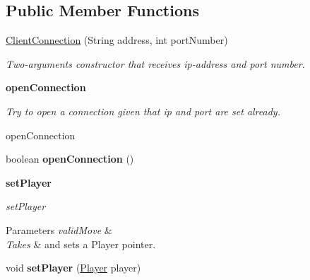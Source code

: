\subsection*{Public Member Functions}
\begin{DoxyCompactItemize}
\item 
\hyperlink{classbattleship_1_1network_1_1ClientConnection_a1d68fb426f1ba3e2aa565fdbf384830d}{Client\+Connection} (String address, int port\+Number)
\begin{DoxyCompactList}\small\item\em Two-\/arguments constructor that receives ip-\/address and port number. \end{DoxyCompactList}\end{DoxyCompactItemize}
\begin{Indent}{\bf open\+Connection}\par
{\em Try to open a connection given that ip and port are set already.

open\+Connection }\begin{DoxyCompactItemize}
\item 
\hypertarget{classbattleship_1_1network_1_1ClientConnection_a95151b03aa520068d1ee0b0af7d0ea8c}{}boolean {\bfseries open\+Connection} ()\label{classbattleship_1_1network_1_1ClientConnection_a95151b03aa520068d1ee0b0af7d0ea8c}

\end{DoxyCompactItemize}
\end{Indent}
\begin{Indent}{\bf set\+Player}\par
{\em set\+Player


\begin{DoxyParams}{Parameters}
{\em valid\+Move} & \\
\hline
{\em Takes} & and sets a Player pointer. \\
\hline
\end{DoxyParams}
}\begin{DoxyCompactItemize}
\item 
\hypertarget{classbattleship_1_1network_1_1ClientConnection_ac83c584d509e8ba2622b1532dc1c9ee0}{}void {\bfseries set\+Player} (\hyperlink{classbattleship_1_1game_1_1Player}{Player} player)\label{classbattleship_1_1network_1_1ClientConnection_ac83c584d509e8ba2622b1532dc1c9ee0}

\end{DoxyCompactItemize}
\end{Indent}
